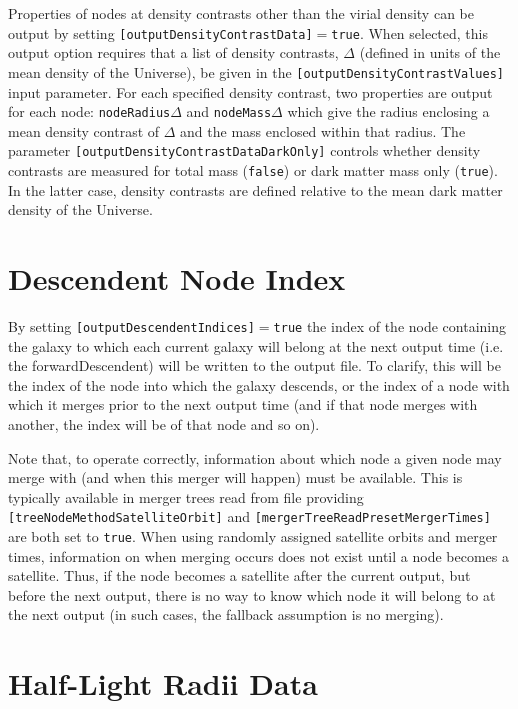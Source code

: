 Properties of nodes at density contrasts other than the virial density can be output by setting {\tt [outputDensityContrastData]}$=${\tt true}. When selected, this output option requires that a list of density contrasts, $\Delta$ (defined in units of the mean density of the Universe), be given in the {\tt [outputDensityContrastValues]} input parameter. For each specified density contrast, two properties are output for each node: {\tt nodeRadius}$\Delta$ and {\tt nodeMass}$\Delta$ which give the radius enclosing a mean density contrast of $\Delta$ and the mass enclosed within that radius. The parameter {\tt [outputDensityContrastDataDarkOnly]} controls whether density contrasts are measured for total mass ({\tt false}) or dark matter mass only ({\tt true}). In the latter case, density contrasts are defined relative to the mean dark matter density of the Universe.

\section{Descendent Node Index}

By setting {\tt [outputDescendentIndices]}$=${\tt true} the index of the node containing the galaxy to which each current galaxy will belong at the next output time (i.e. the \gls{forwardDescendent}) will be written to the output file. To clarify, this will be the index of the node into which the galaxy descends, or the index of a node with which it merges prior to the next output time (and if that node merges with another, the index will be of that node and so on).

Note that, to operate correctly, information about which node a given node may merge with (and when this merger will happen) must be available. This is typically available in merger trees read from file providing {\tt [treeNodeMethodSatelliteOrbit]} and {\tt [mergerTreeReadPresetMergerTimes]} are both set to {\tt true}. When using randomly assigned satellite orbits and merger times, information on when merging occurs does not exist until a node becomes a satellite. Thus, if the node becomes a satellite after the current output, but before the next output, there is no way to know which node it will belong to at the next output (in such cases, the fallback assumption is no merging).

\section{Half-Light Radii Data}

